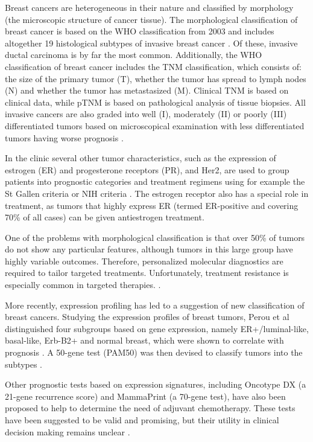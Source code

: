 Breast cancers are heterogeneous in their nature and classified by morphology
(the microscopic structure of cancer tissue).
The morphological classification of breast cancer is based on the WHO
classification from 2003 and includes altogether 19 histological subtypes of
invasive breast cancer \citep{Tavassoli2003,Weigelt2009}. Of these, invasive
ductal carcinoma is by far the most common. Additionally, the WHO
classification of breast cancer includes the TNM classification, which consists of:
the size of the primary tumor (T), whether the tumor has spread to
lymph nodes (N) and whether the tumor has metastasized (M).
Clinical TNM is based on clinical data, while pTNM is based on
pathological analysis of tissue biopsies. All invasive cancers are also graded
into well (I), moderately (II) or poorly (III) differentiated tumors based on
microscopical examination
with less differentiated tumors having worse prognosis \citep{Tavassoli2003}.

In the clinic several other tumor characteristics, such as the expression of estrogen
(ER) and progesterone receptors (PR), and Her2, are used
to group patients into prognostic categories and treatment regimens using for
example the St Gallen criteria \citep{Goldhirsch2007} or NIH criteria
\citep{Eifel2001}. The estrogen receptor also has a special role in treatment,
as tumors that highly express ER (termed ER-positive and covering 70\% of all
cases) can be given antiestrogen treatment.

One of the problems with morphological classification is that over 50\% of
tumors do not show any particular features, although tumors in this large
group have highly variable outcomes. Therefore, personalized molecular
diagnostics are required to tailor targeted treatments. Unfortunately,
treatment resistance is especially common in targeted therapies.
\citep{Oesterreich2013}.

More recently, expression profiling has led to a suggestion of new
classification of breast cancers. Studying the expression profiles of breast
tumors, Perou et al distinguished four subgroups based on gene expression,
namely ER+/luminal-like, basal-like, Erb-B2+ and normal breast,
which were shown to correlate with prognosis
\citep{Perou2000,Sorlie2001}. A 50-gene test (PAM50) was then devised to
classify tumors into the subtypes \citep{Parker2009}.

Other prognostic tests based on expression signatures, including Oncotype DX
(a 21-gene recurrence score) and MammaPrint (a 70-gene test), have also been
proposed to help to determine the need of adjuvant chemotherapy. These tests
have been suggested to be valid and promising, but their utility in clinical
decision making remains unclear \citep{Azim2013}.




